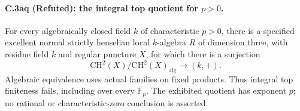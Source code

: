 \paragraph{C.3aq (Refuted): the integral top quotient for $p>0$.}
For every algebraically closed field $k$ of characteristic $p>0$,
there is a specified excellent normal strictly henselian local
$k$-algebra $R$ of dimension three, with residue field $k$ and
regular puncture $X$, for which there is a surjection
\[
 \mathrm{CH}^2(X)/\mathrm{CH}^2(X)_{\mathrm{alg}}
                                      \longrightarrow(k,+).
\]
Algebraic equivalence uses actual families on fixed products.
Thus integral top finiteness fails, including over every
$\overline{\mathbb F}_p$. The exhibited quotient has exponent
$p$; no rational or characteristic-zero conclusion is asserted.

